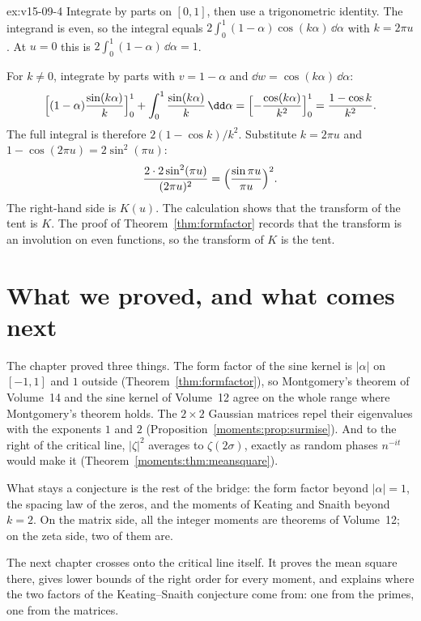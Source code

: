 \begin{solution}{ex:v15-09-4}
\idea Integrate by parts on \([0,1]\), then use a trigonometric identity.
\writeup The integrand is even, so the integral equals \(2\int_0^1(1-\alpha)\cos(k\alpha)\,\dd\alpha\) with \(k=2\pi u\). At \(u=0\) this is \(2\int_0^1(1-\alpha)\,\dd\alpha=1\).

For \(k\ne0\), integrate by parts with \(v=1-\alpha\) and \(\dd w=\cos(k\alpha)\,\dd\alpha\):
\[
\Bigl[(1-\alpha)\frac{\sin(k\alpha)}k\Bigr]_0^1+\int_0^1\frac{\sin(k\alpha)}k\,\dd\alpha
=\Bigl[-\frac{\cos(k\alpha)}{k^2}\Bigr]_0^1=\frac{1-\cos k}{k^2}.
\]
The full integral is therefore \(2(1-\cos k)/k^2\). Substitute \(k=2\pi u\) and \(1-\cos(2\pi u)=2\sin^2(\pi u)\):
\[
\frac{2\cdot2\sin^2(\pi u)}{(2\pi u)^2}=\Bigl(\frac{\sin\pi u}{\pi u}\Bigr)^2.
\]
The right-hand side is \(K(u)\). The calculation shows that the transform of the tent is \(K\). The proof of Theorem~\ref{thm:formfactor} records that the transform is an involution on even functions, so the transform of \(K\) is the tent.
\end{solution}

\section{What we proved, and what comes next}

The chapter proved three things. The form factor of the sine kernel is $|\alpha|$ on $[-1,1]$ and $1$ outside (Theorem~\ref{thm:formfactor}), so Montgomery's theorem of Volume~14 and the sine kernel of Volume~12 agree on the whole range where Montgomery's theorem holds. The $2\times2$ Gaussian matrices repel their eigenvalues with the exponents $1$ and $2$ (Proposition~\ref{moments:prop:surmise}). And to the right of the critical line, $|\zeta|^2$ averages to $\zeta(2\sigma)$, exactly as random phases $n^{-it}$ would make it (Theorem~\ref{moments:thm:meansquare}).

What stays a conjecture is the rest of the bridge: the form factor beyond $|\alpha|=1$, the spacing law of the zeros, and the moments of Keating and Snaith beyond $k=2$. On the matrix side, all the integer moments are theorems of Volume~12; on the zeta side, two of them are.

The next chapter crosses onto the critical line itself. It proves the mean square there, gives lower bounds of the right order for every moment, and explains where the two factors of the Keating--Snaith conjecture come from: one from the primes, one from the matrices.

